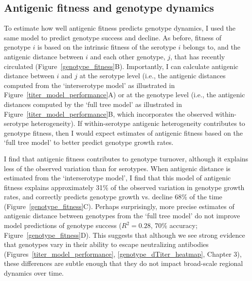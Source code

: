 \subsection{Antigenic fitness and genotype dynamics}
To estimate how well antigenic fitness predicts genotype dynamics, I used the same model to predict genotype success and decline.
As before, fitness of genotype $i$ is based on the intrinsic fitness of the serotype $i$ belongs to, and the antigenic distance between $i$ and each other genotype, $j$, that has recently circulated (Figure~\ref{genotype_fitness}B).
Importantly, I can calculate antigenic distance between $i$ and $j$ at the serotype level (i.e., the antigenic distances computed from the `interserotype model' as illustrated in Figure~\ref{titer_model_performance}A) or at the genotype level (i.e., the antigenic distances computed by the `full tree model' as illustrated in Figure~\ref{titer_model_performance}B, which incorporates the observed within-serotype heterogeneity).
If within-serotype antigenic heterogeneity contributes to genotype fitness, then I would expect estimates of antigenic fitness based on the `full tree model' to better predict genotype growth rates.

I find that antigenic fitness contributes to genotype turnover, although it explains less of the observed variation than for serotypes.
When antigenic distance is estimated from the `interserotype model', I find that this model of antigenic fitness explains approximately 31\% of the observed variation in genotype growth rates, and correctly predicts genotype growth vs. decline 68\% of the time (Figure~\ref{genotype_fitness}C).
Perhaps surprisingly, more precise estimates of antigenic distance between genotypes from the `full tree model' do not improve model predictions of genotype success ($R^2 = 0.28$, 70\% accuracy; Figure~\ref{genotype_fitness}D).
This suggests that although we see strong evidence that genotypes vary in their ability to escape neutralizing antibodies (Figures~\ref{titer_model_performance}, \ref{genotype_dTiter_heatmap}, Chapter 3), these differences are subtle enough that they do not impact broad-scale regional dynamics over time.

